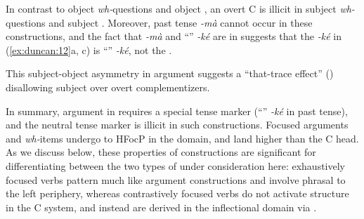 \documentclass[output=paper,
modfonts
]{langscibook}
\begin{document}
In contrast to object \textit{wh-}questions and object , an overt C is illicit in subject \textit{wh-}questions and subject . Moreover, past tense \textit{-mà} cannot occur in these constructions, and the fact that \textit{-mà} and “” \textit{-ké} are in  suggests that the \textit{-ké} in (\ref{ex:duncan:12}a, c) is “” \textit{-ké}, not the .

\settowidth{}
\ea\label{ex:duncan:12}
  \z
\z

This subject-object asymmetry in argument  suggests a “that-trace effect” (\citealt{Perlmutter1971,ChomskyLasnik1977}) disallowing subject  over overt complementizers.

In summary, argument  in  requires a special tense marker (“” \textit{-ké} in past tense), and the neutral tense marker is illicit in such constructions. Focused arguments and \textit{wh-}items undergo  to HFocP in the  domain, and land higher than the C head. As we discuss below, these properties of  constructions are significant for differentiating between the two types of   under consideration here: exhaustively focused verbs pattern much like argument  constructions and involve phrasal  to the left periphery, whereas contrastively focused verbs do not activate structure in the C system, and instead are derived in the inflectional domain via .
\end{document}
